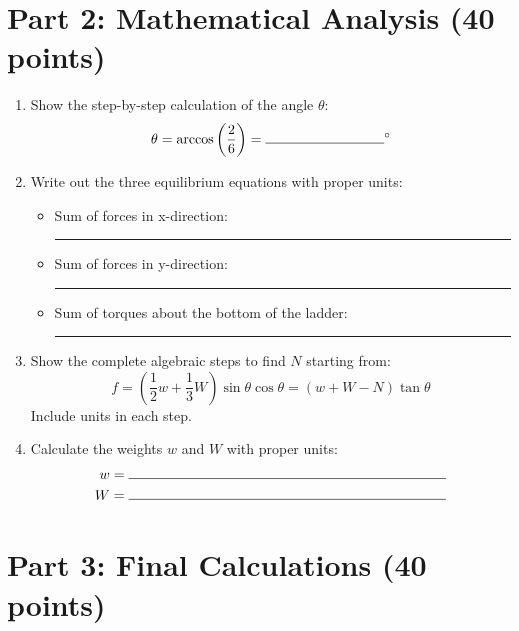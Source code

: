 \documentclass{article}
\begin{document}
\section*{Part 2: Mathematical Analysis (40 points)}

\begin{enumerate}[label=\arabic*., leftmargin=*, start=4]
    \item Show the step-by-step calculation of the angle $\theta$:
    \[\theta = \arccos\left(\frac{2}{6}\right) = \rule{3cm}{0.15mm}^\circ\]
    
    \item Write out the three equilibrium equations with proper units:
    \begin{itemize}
        \item Sum of forces in x-direction: \rule{8cm}{0.15mm}
        \item Sum of forces in y-direction: \rule{8cm}{0.15mm}
        \item Sum of torques about the bottom of the ladder: \rule{8cm}{0.15mm}
    \end{itemize}
    
    \item Show the complete algebraic steps to find $N$ starting from:
    \[f = \left(\frac{1}{2}w + \frac{1}{3}W\right)\sin \theta \cos \theta = (w + W - N)\tan \theta\]
    Include units in each step.
    
    \item Calculate the weights $w$ and $W$ with proper units:
    \begin{align*}
        w &= \rule{8cm}{0.15mm} \\
        W &= \rule{8cm}{0.15mm}
    \end{align*}
\end{enumerate}

\section*{Part 3: Final Calculations (40 points)}
\end{document}
